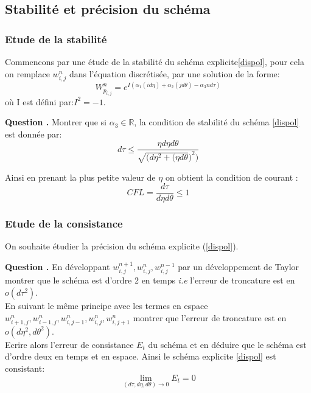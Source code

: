 \documentclass[a4,12pt]{article}
\newcounter{Nbquestion}
\newcommand*\question{%
\stepcounter{Nbquestion}%
\textbf{Question \theNbquestion. }}
\begin{document}
\subsection{Stabilité et précision du schéma}

\subsubsection{Etude de la stabilité}
Commencons par une étude de la stabilité du schéma explicite\ref{dispol}, pour cela on remplace $w_{i,j}^{n}$ dans l'équation discrétisée, par une solution de la forme: 
\[
W_{p_{i,j}}^{n}=e^{I(\alpha_1(id\eta)+\alpha_2(jd\theta)-\alpha_3 n d\tau)}
\]
où I est défini par:$I^2=-1$.


\begin{mdframed}[style=exampledefault]
\question  Montrer que si $\alpha_3\in \mathbb{R}$,  la condition de stabilité du schéma \ref{dispol} est donnée par:
$$d \tau\leq \dfrac{ \eta d\eta d\theta}{\sqrt{(d \eta^2+(\eta d\theta})^{2})}$$
\end{mdframed}
Ainsi en prenant la plus petite valeur de $\eta$  on obtient la condition de courant : 
\begin{equation}
 CFL=\frac{d \tau}{d \eta d \theta}\leq 1
	\label{eq:CFL}
\end{equation}

\subsubsection{Etude de la consistance}
On souhaite étudier la précision du schéma explicite (\ref{dispol}).


\begin{mdframed}[style=exampledefault]
\question En développant $w_{i,j}^{n+1},w_{i,j}^{n},w_{i,j}^{n-1}$ par un développement de Taylor montrer que le schéma est d'ordre 2 en temps \textit{i.e} l'erreur de troncature est en $o(d\tau^2)$.\\
En suivant le même principe avec les termes en espace $w_{i+1,j}^{n},w_{i-1,j}^{n},w_{i,j-1}^{n},w_{i,j}^{n},w_{i,j+1}^{n}$ montrer que l'erreur de troncature est en $o (d\eta^2,d\theta^2)$.\\
Ecrire alors l'erreur de consistance $E_t$ du schéma et en déduire que le schéma est d'ordre deux en temps et en espace.
Ainsi le schéma explicite \ref{dispol} est consistant:
\[
\lim_{(d\tau,d\eta,d\theta)\longrightarrow 0} E_t=0
\]
\end{mdframed}
\end{document}
